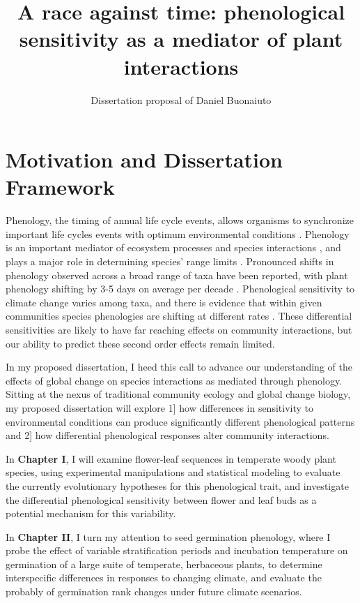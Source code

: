 \documentclass{article}\usepackage[]{graphicx}\usepackage[]{color}
\begin{document}
\title{A race against time: phenological sensitivity as a mediator of plant interactions}
\author{Dissertation proposal of Daniel Buonaiuto}
\maketitle{}
\section*{Motivation and Dissertation Framework}
\indent\indent Phenology, the timing of annual life cycle events, allows organisms to synchronize important life cycles events with optimum environmental conditions \citep{Forrest2010}. Phenology is an important mediator of ecosystem processes \citep{Piao2007,Cleland2007} and species interactions \citep{Yang2010,Leverett2017}, and plays a major role in determining species' range limits \citep{Chuine2001}. Pronounced shifts in phenology observed across a broad range of taxa have been reported, with plant phenology shifting by 3-5 days on average per decade \citep{Parmesan2003,Menzel2006,Root2003}. Phenological sensitivity to climate change varies among taxa, and there is evidence that within given communities species phenologies are shifting at different rates \citep{Cleland2012,Ovaskainen2013}. These differential sensitivities are likely to have far reaching effects on community interactions, but our ability to predict these second order effects remain limited.
\par In my proposed dissertation, I heed this call to advance our understanding of the effects of global change on species interactions as mediated through phenology. Sitting at the nexus of traditional community ecology and global change biology, my proposed dissertation will explore 1] how differences in sensitivity to environmental conditions can produce significantly different phenological patterns and 2] how differential phenological responses alter community interactions.
\par In \textbf{Chapter I}, I will examine flower-leaf sequences in temperate woody plant species, using experimental manipulations and statistical modeling to evaluate the currently evolutionary hypotheses for this phenological trait, and investigate the differential phenological sensitivity between flower and leaf buds as a potential mechanism for this variability.
\par In \textbf{Chapter II}, I turn my attention to seed germination phenology, where I probe the effect of variable stratification periods and incubation temperature on germination of a large suite of temperate, herbaceous plants, to determine interspecific differences in responses to changing climate, and evaluate the probably of germination rank changes under future climate scenarios.
\end{document}
